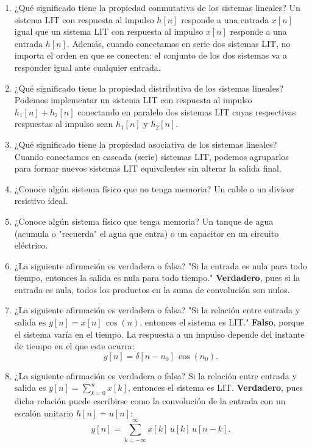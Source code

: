 \begin{enumerate}
	\item ¿Qué significado tiene la propiedad conmutativa de los sistemas lineales?
	Un sistema LIT con respuesta al impulso $h[n]$ responde a una entrada $x[n]$ igual que un sistema LIT con respuesta al impulso $x[n]$ responde a una entrada $h[n]$. Además, cuando conectamos en serie dos sistemas LIT, no importa el orden en que se conecten: el conjunto de los dos sistemas va a responder igual ante cualquier entrada.
	
	\item ¿Qué significado tiene la propiedad distributiva de los sistemas lineales?
	Podemos implementar un sistema LIT con respuesta al impulso $h_{1}[n] + h_{2}[n]$ conectando en paralelo dos sistemas LIT cuyas respectivas respuestas al impulso sean $h_{1}[n]$ y $h_{2}[n]$.
	
	\item ¿Qué significado tiene la propiedad asociativa de los sistemas lineales?
	Cuando conectamos en cascada (serie) sistemas LIT, podemos agruparlos para formar nuevos sistemas LIT equivalentes sin alterar la salida final.
	
	\item ¿Conoce algún sistema físico que no tenga memoria?
	Un cable o un divisor resistivo ideal.
	
	\item ¿Conoce algún sistema físico que tenga memoria?
	Un tanque de agua (acumula o "recuerda" el agua que entra) o un capacitor en un circuito eléctrico.
	
	\item ¿La siguiente afirmación es verdadera o falsa? "Si la entrada es nula para todo tiempo, entonces la salida es nula para todo tiempo."
	\textbf{Verdadero}, pues si la entrada es nula, todos los productos en la suma de convolución son nulos.
	
	\item ¿La siguiente afirmación es verdadera o falsa? "Si la relación entre entrada y salida es $y[n] = x[n] \, \cos(n)$, entonces el sistema es LIT."
	\textbf{Falso}, porque el sistema varía en el tiempo. La respuesta a un impulso depende del instante de tiempo en el que este ocurra:
	\begin{equation}
		y[n] = \delta[n - n_{0}] \, \cos(n_{0}).
	\end{equation}
	
	\item ¿La siguiente afirmación es verdadera o falsa? Si la relación entre entrada y salida es $y[n] = \sum_{k=0}^{n} x[k]$, entonces el sistema es LIT.
	\textbf{Verdadero}, pues dicha relación puede escribirse como la convolución de la entrada con un escalón unitario $h[n] = u[n]$:
	\begin{equation}
		y[n] = \sum_{k=-\infty}^{\infty} x[k] \, u[k] \, u[n-k].
	\end{equation}
\end{enumerate}